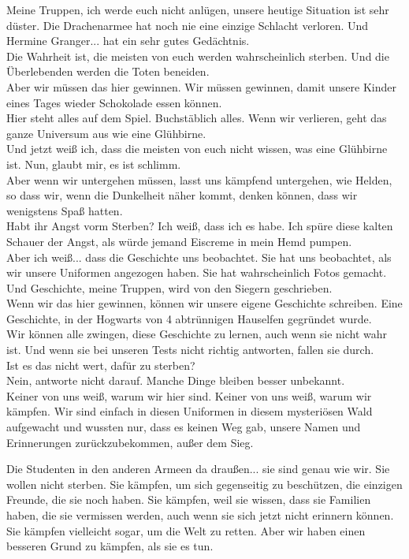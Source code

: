 {Meine Truppen, ich werde euch nicht anlügen, unsere heutige Situation ist sehr düster. Die Drachenarmee hat noch nie eine einzige Schlacht verloren. Und Hermine Granger... hat ein sehr gutes Gedächtnis.\\ Die Wahrheit ist, die meisten von euch werden wahrscheinlich sterben. Und die Überlebenden werden die Toten beneiden.\\ Aber wir müssen das hier gewinnen. Wir müssen gewinnen, damit unsere Kinder eines Tages wieder Schokolade essen können.\\ Hier steht alles auf dem Spiel. Buchstäblich alles. Wenn wir verlieren, geht das ganze Universum aus wie eine Glühbirne.\\ Und jetzt weiß ich, dass die meisten von euch nicht wissen, was eine Glühbirne ist. Nun, glaubt mir, es ist schlimm.\\ Aber wenn wir untergehen müssen, lasst uns kämpfend untergehen, wie Helden, so dass wir, wenn die Dunkelheit näher kommt, denken können, dass wir wenigstens Spaß hatten.\\ Habt ihr Angst vorm Sterben? Ich weiß, dass ich es habe. Ich spüre diese kalten Schauer der Angst, als würde jemand Eiscreme in mein Hemd pumpen.\\ Aber ich weiß... dass die Geschichte uns beobachtet. Sie hat uns beobachtet, als wir unsere Uniformen angezogen haben. Sie hat wahrscheinlich Fotos gemacht. Und Geschichte, meine Truppen, wird von den Siegern geschrieben.\\ Wenn wir das hier gewinnen, können wir unsere eigene Geschichte schreiben. Eine Geschichte, in der Hogwarts von 4 abtrünnigen Hauselfen gegründet wurde.\\ Wir können alle zwingen, diese Geschichte zu lernen, auch wenn sie nicht wahr ist. Und wenn sie bei unseren Tests nicht richtig antworten, fallen sie durch.\\ Ist es das nicht wert, dafür zu sterben?\\ Nein, antworte nicht darauf. Manche Dinge bleiben besser unbekannt.\\ Keiner von uns weiß, warum wir hier sind. Keiner von uns weiß, warum wir kämpfen. Wir sind einfach in diesen Uniformen in diesem mysteriösen Wald aufgewacht und wussten nur, dass es keinen Weg gab, unsere Namen und Erinnerungen zurückzubekommen, außer dem Sieg.

Die Studenten in den anderen Armeen da draußen... sie sind genau wie wir. Sie wollen nicht sterben. Sie kämpfen, um sich gegenseitig zu beschützen, die einzigen Freunde, die sie noch haben. Sie kämpfen, weil sie wissen, dass sie Familien haben, die sie vermissen werden, auch wenn sie sich jetzt nicht erinnern können.\\ Sie kämpfen vielleicht sogar, um die Welt zu retten. Aber wir haben einen besseren Grund zu kämpfen, als sie es tun.

}

